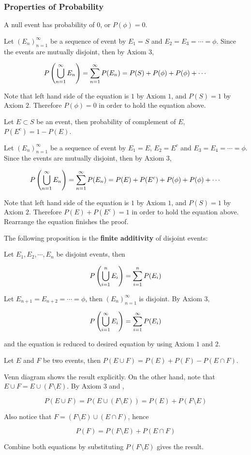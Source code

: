 \documentclass[a4paper,12pt]{article}
\begin{document}
\subsubsection{Properties of Probability}
\begin{pst}
  A null event has probability of $0$, or $P(\phi)=0$.\n

  \prf Let $(E_{n})_{n=1}^{\infty}$ be a sequence of event by $E_{1}=S$ and $E_{2}=E_{3}=\cdots=\phi$. Since the events are mutually disjoint, then by Axiom $3$,

  $$P\left( \bigcup_{n=1}^{\infty}E_{n}\right)=\sum_{n=1}^{\infty}P(E_{n})=P(S)+P(\phi)+P(\phi)+\cdots$$\s

  Note that left hand side of the equation is $1$ by Axiom $1$, and $P(S)=1$ by Axiom $2$. Therefore $P(\phi)=0$ in order to hold the equation above.
\end{pst}\n

\begin{pst}
  Let $E\subset S$ be an event, then probability of complement of $E$, $P(E^{c})=1-P(E)$.\n

  \prf Let $(E_{n})_{n=1}^{\infty}$ be a sequence of event by $E_{1}=E$, $E_{2}=E^{c}$ and $E_{3}=E_{4}=\cdots=\phi$. Since the events are mutually disjoint, then by Axiom $3$,

  $$P\left( \bigcup_{n=1}^{\infty}E_{n}\right)=\sum_{n=1}^{\infty}P(E_{n})=P(E)+P(E^{c})+P(\phi)+P(\phi)+\cdots$$\s

  Note that left hand side of the equation is $1$ by Axiom $1$, and $P(S)=1$ by Axiom $2$. Therefore $P(E)+P(E^{c})=1$ in order to hold the equation above. Rearrange the equation finishes the proof.
\end{pst}\n

The following proposition is the \textbf{finite additivity} of disjoint events:\n

\begin{pst}
  Let $E_{1},E_{2},\cdots,E_{n}$ be disjoint events, then

  $$P\left( \bigcup_{i=1}^{n}E_{i}\right)=\sum_{i=1}^{n}P(E_{i})$$\s

  \prf Let $E_{n+1}=E_{n+2}=\cdots=\phi$, then $(E_{n})_{n=1}^{\infty}$ is disjoint. By Axiom $3$,

  $$P\left( \bigcup_{i=1}^{\infty}E_{i}\right)=\sum_{i=1}^{\infty}P(E_{i})$$\s

  and the equation is reduced to desired equation by using Axiom $1$ and $2$. 
\end{pst}\n

\begin{pst}
  Let $E$ and $F$ be two events, then $P(E\cup F)=P(E)+P(F)-P(E\cap F)$.\n

  \prf Venn diagram shows the result explicitly. On the other hand, note that $E\cup F=E\cup(F\setminus E)$. By Axiom $3$ and \rpst[\sctd{1}],
  
  $$P(E\cup F)=P(E\cup(F\setminus E))=P(E)+P(F\setminus E)$$\s

  Also notice that $F=(F\setminus E)\cup(E\cap F)$, hence

  $$P(F)=P(F\setminus E)+P(E\cap F)$$\s

  Combine both equations by substituting $P(F\setminus E)$ gives the result.
\end{pst}\n
\end{document}
